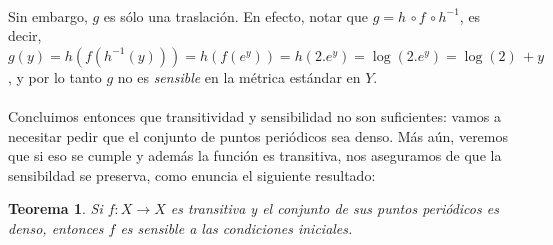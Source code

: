 \documentclass[12pt,a4paper]{article}
\newtheorem{theorem}{Teorema}[section]
\begin{document}
\\
Sin embargo, $g$ es sólo una traslación. En efecto, notar que $g = h \, \circ f \, \circ h^{-1}$, es decir, $g(y) = h(f(h^{-1}(y))) = h(f(e^y)) = h(2.e^y) = \log(2.e^y) = \operatorname{log}(2) \, + y$, y por lo tanto $g$ no es \textit{sensible} en la métrica estándar en $Y$.
\\
\\
Concluimos entonces que transitividad y sensibilidad no son suficientes: vamos a necesitar pedir que el conjunto de puntos periódicos sea denso. Más aún, veremos que si eso se cumple y además la función es transitiva, nos aseguramos de que la sensibildad se preserva, como enuncia el siguiente resultado:
\begin{theorem}
Si $f: X \rightarrow X$ es transitiva y el conjunto de sus puntos periódicos es denso, entonces $f$ es sensible a las condiciones iniciales.
\end{theorem}
\end{document}
